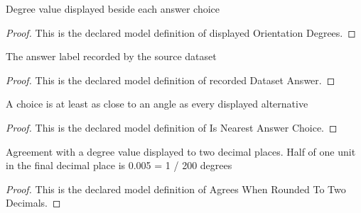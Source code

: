 \begin{definition}
  \label{def:physics:phyx-mini-0526:phyxminiproblems-problemphyxmini0526-displayedorientationdegrees}
  Degree value displayed beside each answer choice
\end{definition}
\begin{proof}
  This is the declared model definition of displayed Orientation Degrees.
\end{proof}
\begin{definition}
  \label{def:physics:phyx-mini-0526:phyxminiproblems-problemphyxmini0526-recordeddatasetanswer}
  The answer label recorded by the source dataset
\end{definition}
\begin{proof}
  This is the declared model definition of recorded Dataset Answer.
\end{proof}
\begin{definition}
  \label{def:physics:phyx-mini-0526:phyxminiproblems-problemphyxmini0526-isnearestanswerchoice}
  A choice is at least as close to an angle as every displayed alternative
\end{definition}
\begin{proof}
  This is the declared model definition of Is Nearest Answer Choice.
\end{proof}
\begin{definition}
  \label{def:physics:phyx-mini-0526:phyxminiproblems-problemphyxmini0526-agreeswhenroundedtotwodecimals}
  Agreement with a degree value displayed to two decimal places. Half of one unit in the final decimal place is 0.005 = 1 / 200 degrees
\end{definition}
\begin{proof}
  This is the declared model definition of Agrees When Rounded To Two Decimals.
\end{proof}
